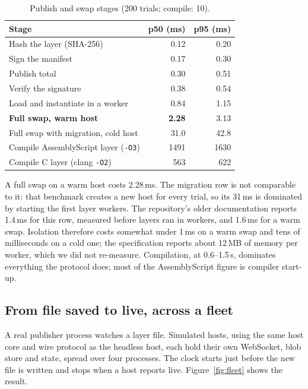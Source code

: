 \documentclass[10pt,twocolumn]{article}
\newcommand{\code}[1]{\texttt{#1}}
\newcommand{\ms}{\,ms\xspace}
\newcommand{\s}{\,s\xspace}
\begin{document}
\begin{table}[t]
\centering\footnotesize
\begin{tabular}{@{}lrr@{}}
\toprule
Stage & p50 (ms) & p95 (ms) \\
\midrule
Hash the layer (SHA-256) & 0.12 & 0.20 \\
Sign the manifest & 0.17 & 0.30 \\
\quad Publish total & 0.30 & 0.51 \\
Verify the signature & 0.38 & 0.54 \\
Load and instantiate in a worker & 0.84 & 1.15 \\
\textbf{Full swap, warm host} & \textbf{2.28} & 3.13 \\
Full swap with migration, cold host & 31.0 & 42.8 \\
\midrule
Compile AssemblyScript layer (\code{-O3}) & 1491 & 1630 \\
Compile C layer (clang \code{-O2}) & 563 & 622 \\
\bottomrule
\end{tabular}
\caption{Publish and swap stages (200 trials; compile: 10).}
\label{tab:stages}
\end{table}

A full swap on a warm host costs 2.28\ms. The migration row is not comparable to it: that
benchmark creates a new host for every trial, so its 31\ms is dominated by starting the first
layer workers. The repository's older documentation reports 1.4\ms for this row, measured before
layers ran in workers, and 1.6\ms for a warm swap. Isolation therefore costs somewhat under
1\ms on a warm swap and tens of milliseconds on a cold one; the specification reports about
12\,MB of memory per worker, which we did not re-measure. Compilation, at 0.6--1.5\s,
dominates everything the protocol does; most of the AssemblyScript figure is compiler start-up.

\subsection{From file saved to live, across a fleet}

A real publisher process watches a layer file. Simulated hosts, using the same host core and wire
protocol as the headless host, each hold their own WebSocket, blob store and state, spread over
four processes. The clock starts just before the new file is written and stops when a host
reports live. Figure~\ref{fig:fleet} shows the result.
\end{document}
